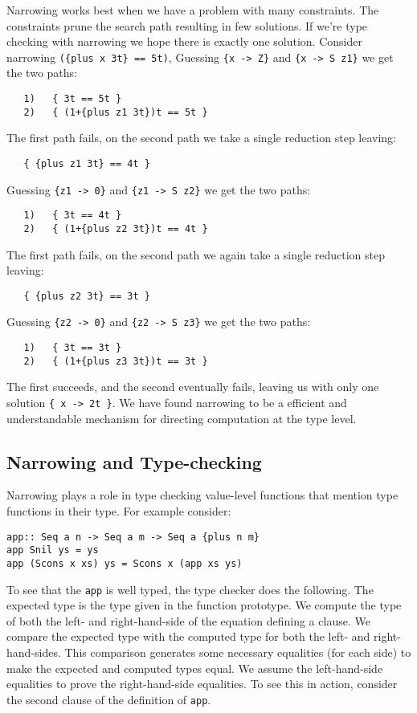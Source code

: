 \documentclass[11pt,twoside]{article}
\begin{document}
Narrowing works best when we have a problem with many constraints. The
constraints prune the search path resulting in few solutions.
If we're type checking with narrowing we hope there is exactly one solution.
Consider narrowing \verb+({plus x 3t} == 5t)+,
Guessing \verb+{x -> Z}+ and \verb+{x -> S z1}+ we get the two
paths:
{ %
\begin{verbatim}
   1)   { 3t == 5t }
   2)   { (1+{plus z1 3t})t == 5t }
\end{verbatim}}
The first path fails, on the second path we take a single reduction step
leaving:
{ %
\begin{verbatim}
   { {plus z1 3t} == 4t }
\end{verbatim}}
Guessing \verb+{z1 -> 0}+ and \verb+{z1 -> S z2}+ we get the two
paths:
{ %
\begin{verbatim}
   1)   { 3t == 4t }
   2)   { (1+{plus z2 3t})t == 4t }
\end{verbatim}}
The first path fails, on the second path we again
take a single reduction step leaving:
{ %
\begin{verbatim}
   { {plus z2 3t} == 3t }
\end{verbatim}}
Guessing \verb+{z2 -> 0}+ and \verb+{z2 -> S z3}+ we get the two
paths:
{ %
\begin{verbatim}
   1)   { 3t == 3t }
   2)   { (1+{plus z3 3t})t == 3t }
\end{verbatim}}
The first succeeds, and the second eventually fails, leaving us
with only one solution \verb+{ x -> 2t }+. We have found
narrowing to be a efficient and understandable mechanism
for directing computation at the type level.


\subsection{Narrowing and Type-checking}

Narrowing plays a role in type checking value-level functions that mention
type functions in their type. For example consider:

{\small
\begin{verbatim}
app:: Seq a n -> Seq a m -> Seq a {plus n m}
app Snil ys = ys
app (Scons x xs) ys = Scons x (app xs ys)
\end{verbatim}}

To see that the {\tt app} is well typed, the type checker does the following.
The expected type is the type given in the function prototype. We
compute the type of both the left- and right-hand-side of the equation
defining a clause. We compare the expected type with the computed type
for both the left- and right-hand-sides. This comparison generates
some necessary equalities (for each side) to make the expected and computed
types equal. We assume the left-hand-side
equalities to prove the right-hand-side equalities. To see this in
action, consider the second clause of the definition of \verb+app+.
\end{document}
